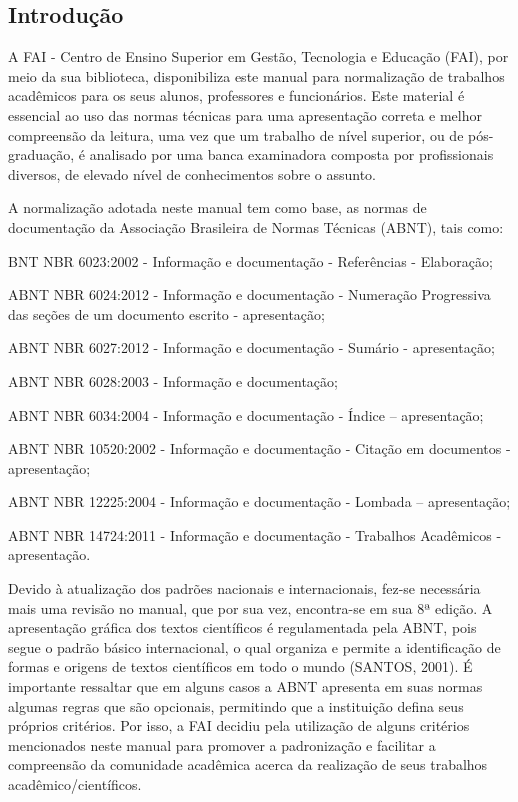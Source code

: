 \documentclass[a4paper,12pt]{article}  %
\begin{document}
\begin{ElementosTextuais}
\begin{Introducao} %
\section{Introdução}
A FAI - Centro de Ensino Superior em Gestão, Tecnologia e Educação (FAI), por meio da sua biblioteca, disponibiliza este manual para normalização de trabalhos acadêmicos para os seus alunos, professores e funcionários. Este material é essencial ao uso das normas técnicas para uma apresentação correta e melhor compreensão da leitura, uma vez que um trabalho de nível superior, ou de pós-graduação, é analisado por uma banca examinadora composta por profissionais diversos, de elevado nível de conhecimentos sobre o assunto.

A normalização adotada neste manual tem como base, as normas de documentação da Associação Brasileira de Normas Técnicas (ABNT), tais como:
\begin{alphaitemize}
    \item BNT NBR 6023:2002 - Informação e documentação - Referências - Elaboração;
    \item ABNT NBR 6024:2012 - Informação e documentação - Numeração Progressiva das
seções de um documento escrito - apresentação;
    \item ABNT NBR 6027:2012 - Informação e documentação - Sumário - apresentação;
    \item ABNT NBR 6028:2003 - Informação e documentação;
    \item ABNT NBR 6034:2004 - Informação e documentação - Índice – apresentação;
    \item ABNT NBR 10520:2002 - Informação e documentação - Citação em documentos -
apresentação;
    \item ABNT NBR 12225:2004 - Informação e documentação - Lombada – apresentação;
    \item ABNT NBR 14724:2011 - Informação e documentação - Trabalhos Acadêmicos -
apresentação.
\end{alphaitemize}

Devido à atualização dos padrões nacionais e internacionais, fez-se necessária mais uma revisão no manual, que por sua vez, encontra-se em sua 8ª edição. A apresentação gráfica dos textos científicos é regulamentada pela ABNT, pois segue o padrão básico internacional, o qual organiza e permite a identificação de formas e origens de textos científicos em todo o mundo (SANTOS, 2001). É importante ressaltar que em alguns casos a ABNT apresenta em suas normas algumas regras que são opcionais, permitindo que a instituição defina seus próprios critérios. Por isso, a FAI decidiu pela utilização de alguns critérios mencionados neste manual para promover a padronização e facilitar a compreensão da comunidade acadêmica acerca da realização de seus trabalhos acadêmico/científicos.


\end{Introducao}
\end{ElementosTextuais}
\end{document}
